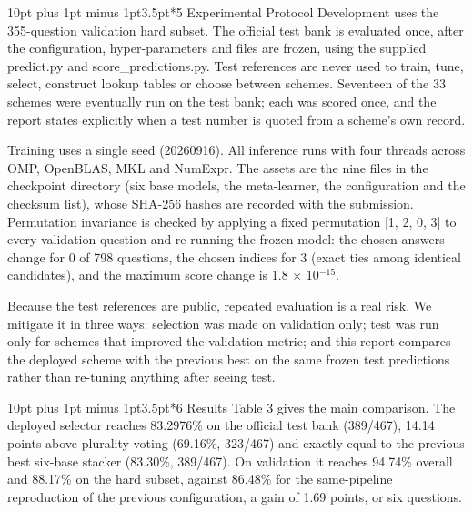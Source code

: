 \documentclass[10pt,a4paper]{article}
\makeatletter
\renewcommand\section{\@startsection{section}{1}{\z@}%
  {10pt plus 1pt minus 1pt}{3.5pt}{\normalfont\large\bfseries}}
\makeatother
\begin{document}
\section*{5 Experimental Protocol}
Development uses the 355-question validation hard subset. The official test bank is evaluated once, after the configuration, hyper-parameters and files are frozen, using the supplied predict.py and score\_predictions.py. Test references are never used to train, tune, select, construct lookup tables or choose between schemes. Seventeen of the 33 schemes were eventually run on the test bank; each was scored once, and the report states explicitly when a test number is quoted from a scheme’s own record.

Training uses a single seed (20260916). All inference runs with four threads across OMP, OpenBLAS, MKL and NumExpr. The assets are the nine files in the checkpoint directory (six base models, the meta-learner, the configuration and the checksum list), whose SHA-256 hashes are recorded with the submission. Permutation invariance is checked by applying a fixed permutation [1, 2, 0, 3] to every validation question and re-running the frozen model: the chosen answers change for 0 of 798 questions, the chosen indices for 3 (exact ties among identical candidates), and the maximum score change is 1.8 $\times$ 10$^{-15}$.

Because the test references are public, repeated evaluation is a real risk. We mitigate it in three ways: selection was made on validation only; test was run only for schemes that improved the validation metric; and this report compares the deployed scheme with the previous best on the same frozen test predictions rather than re-tuning anything after seeing test.

\section*{6 Results}
Table 3 gives the main comparison. The deployed selector reaches 83.2976\% on the official test bank (389/467), 14.14 points above plurality voting (69.16\%, 323/467) and exactly equal to the previous best six-base stacker (83.30\%, 389/467). On validation it reaches 94.74\% overall and 88.17\% on the hard subset, against 86.48\% for the same-pipeline reproduction of the previous configuration, a gain of 1.69 points, or six questions.
\end{document}
